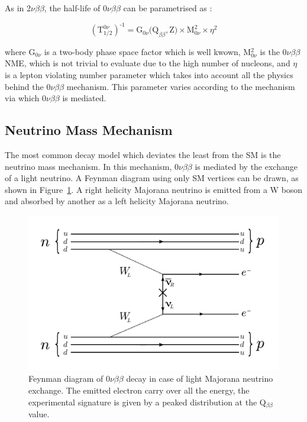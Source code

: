 \documentclass[main.tex]{subfiles}
\begin{document}
\bigskip


\NI As in 2$\nu\beta\beta$, the half-life of 0$\nu\beta\beta$ can be parametrised as : 


\begin{equation}\label{eq:halflife0nu}
(\text{T}_{\text{1/2}}^{\text{0}\nu})^{\text{-1}} = \text{G}_{\text{0}\nu}\text{(Q}_{\beta\beta},\text{Z)} \times \text{M}^\text{2}_{\text{0}\nu} \times \eta^\text{2}
\end{equation}


\bigskip


\NI where G$_{\text{0}\nu}$ is a two-body phase space factor which is well kwown, M$^\text{2}_{\text{0}\nu}$ is the 0$\nu\beta\beta$ NME, which is not trivial to evaluate due to the high number of nucleons, and $\eta$ is a lepton violating number parameter which takes into account all the physics behind the 0$\nu\beta\beta$ mechanism. This parameter varies according to the mechanism via which 0$\nu\beta\beta$ is mediated.  


\FloatBarrier


\subsection{Neutrino Mass Mechanism}\label{sec:NMM}



\NI The most common decay model which deviates the least from the SM is the neutrino mass mechanism. In this mechanism, 0$\nu\beta\beta$ is mediated by the exchange of a light neutrino. A Feynman diagram using only SM vertices can be drawn, as shown in Figure~\ref{0nubbNMM}. A right helicity Majorana neutrino is emitted from a W boson and absorbed by another as a left helicity Majorana neutrino. 


\begin{figure}[h!]
\begin{center}
\includegraphics[scale=0.5]{pictures/Chap2/0nubbFeynmanDiagram_NMM.pdf}
\caption{Feynman diagram of 0$\nu\beta\beta$ decay in case of light Majorana neutrino exchange. The emitted electron carry over all the energy, the experimental signature is given by a peaked distribution at the Q$_{\beta\beta}$ value.}
\label{0nubbNMM}
\end{center}
\end{figure}
\end{document}
